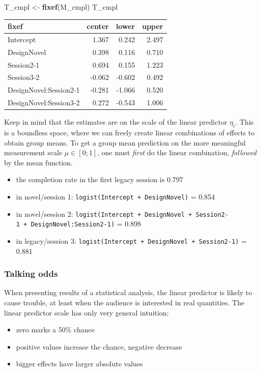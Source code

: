\documentclass[]{svmono}
\newenvironment{Shaded}{\begin{snugshade}}{\end{snugshade}}
\newcommand{\KeywordTok}[1]{\textcolor[rgb]{0.13,0.29,0.53}{\textbf{#1}}}
\newcommand{\StringTok}[1]{\textcolor[rgb]{0.31,0.60,0.02}{#1}}
\newcommand{\NormalTok}[1]{#1}
\providecommand{\tightlist}{%
  \setlength{\itemsep}{0pt}\setlength{\parskip}{0pt}}
\theoremstyle{definition}
\theoremstyle{definition}
\theoremstyle{definition}
\theoremstyle{remark}
\begin{document}
\begin{Shaded}
\begin{Highlighting}[]
\NormalTok{T_cmpl <-}\StringTok{ }
\StringTok{  }\KeywordTok{fixef}\NormalTok{(M_cmpl)}
\NormalTok{T_cmpl}
\end{Highlighting}
\end{Shaded}

\begin{longtable}[]{@{}lrrr@{}}
\toprule
fixef & center & lower & upper\tabularnewline
\midrule
\endhead
Intercept & 1.367 & 0.242 & 2.497\tabularnewline
DesignNovel & 0.398 & 0.116 & 0.710\tabularnewline
Session2-1 & 0.694 & 0.155 & 1.223\tabularnewline
Session3-2 & -0.062 & -0.602 & 0.492\tabularnewline
DesignNovel:Session2-1 & -0.281 & -1.066 & 0.520\tabularnewline
DesignNovel:Session3-2 & 0.272 & -0.543 & 1.006\tabularnewline
\bottomrule
\end{longtable}

Keep in mind that the estimates are on the scale of the linear predictor
\(\eta_i\). This is a boundless space, where we can freely create linear
combinations of effects to obtain group means. To get a group mean
prediction on the more meaningful measurement scale \(\mu \in [0;1]\),
one must \emph{first} do the linear combination, \emph{followed} by the
mean function.

\begin{itemize}
\tightlist
\item
  the completion rate in the first legacy session is 0.797
\item
  in novel/session 1: \texttt{logist(Intercept\ +\ DesignNovel)} = 0.854
\item
  in novel/session 2:
  \texttt{logist(Intercept\ +\ DesignNovel\ +\ Session2-1\ +\ DesignNovel:Session2-1)}
  = 0.898
\item
  in legacy/session 3:
  \texttt{logist(Intercept\ +\ DesignNovel\ +\ Session2-1)} = 0.881
\end{itemize}

\subsubsection{Talking odds}\label{talking-odds}

When presenting results of a statistical analysis, the linear predictor
is likely to cause trouble, at least when the audience is interested in
real quantities. The linear predictor scale has only very general
intuition:

\begin{itemize}
\tightlist
\item
  zero marks a 50\% chance
\item
  positive values increase the chance, negative decrease
\item
  bigger effects have larger absolute values
\end{itemize}
\end{document}
